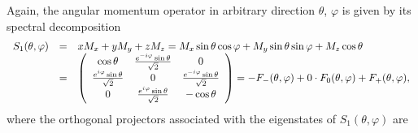\documentclass[pra,amsfonts,showpacs,showkeys,preprint]{revtex4}
\begin{document}
Again, the angular momentum operator in arbitrary direction $\theta$, $\varphi$ is given by its spectral decomposition
\begin{equation}
\begin{array}{rcl}
S_1 (\theta ,\varphi) &=&
xM_x
+
yM_y
+
zM_z
=
 M_x  \sin \theta \cos \varphi
+
M_y   \sin \theta \sin \varphi
+
M_z   \cos \theta
\\
&=&   \left(
\begin{array}{cccc}
\cos \theta & {e^{-i\varphi}\sin \theta \over \sqrt{2}}& 0      \\
{e^{i\varphi}\sin \theta \over \sqrt{2}}& 0
& {e^{-i\varphi}\sin \theta \over \sqrt{2}}      \\
0& {e^{i\varphi}\sin \theta \over \sqrt{2}}& -\cos \theta
\end{array}\right)
= -F_{-}(\theta ,\varphi)+0\cdot F_0(\theta ,\varphi) +F_{+}(\theta ,\varphi),
\end{array}
\label{e-2009-gtq-s3}
\end{equation}
where the orthogonal projectors associated with the eigenstates of $S_1 (\theta ,\varphi)$ are
\end{document}
